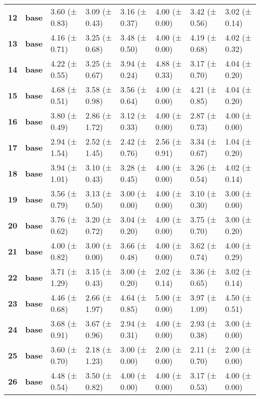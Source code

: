 \begin{longtable}{llllllll}
\cline{1-8}
\textbf{12} & \textbf{base} & 3.60 (± 0.83) & 3.09 (± 0.43) & 3.16 (± 0.37) & 4.00 (± 0.00) & 3.42 (± 0.56) & 3.02 (± 0.14) \\
\cline{1-8}
\textbf{13} & \textbf{base} & 4.16 (± 0.71) & 3.25 (± 0.68) & 3.48 (± 0.50) & 4.00 (± 0.00) & 4.19 (± 0.68) & 4.02 (± 0.32) \\
\cline{1-8}
\textbf{14} & \textbf{base} & 4.22 (± 0.55) & 3.25 (± 0.67) & 3.94 (± 0.24) & 4.88 (± 0.33) & 3.17 (± 0.70) & 4.04 (± 0.20) \\
\cline{1-8}
\textbf{15} & \textbf{base} & 4.68 (± 0.51) & 3.58 (± 0.98) & 3.56 (± 0.64) & 4.00 (± 0.00) & 4.21 (± 0.85) & 4.04 (± 0.20) \\
\cline{1-8}
\textbf{16} & \textbf{base} & 3.80 (± 0.49) & 2.86 (± 1.72) & 3.12 (± 0.33) & 4.00 (± 0.00) & 2.87 (± 0.73) & 4.00 (± 0.00) \\
\cline{1-8}
\textbf{17} & \textbf{base} & 2.94 (± 1.54) & 2.52 (± 1.45) & 2.42 (± 0.76) & 2.56 (± 0.91) & 3.34 (± 0.67) & 1.04 (± 0.20) \\
\cline{1-8}
\textbf{18} & \textbf{base} & 3.94 (± 1.01) & 3.10 (± 0.43) & 3.28 (± 0.45) & 4.00 (± 0.00) & 3.26 (± 0.54) & 4.02 (± 0.14) \\
\cline{1-8}
\textbf{19} & \textbf{base} & 3.56 (± 0.79) & 3.13 (± 0.50) & 3.00 (± 0.00) & 4.00 (± 0.00) & 3.10 (± 0.30) & 3.00 (± 0.00) \\
\cline{1-8}
\textbf{20} & \textbf{base} & 3.76 (± 0.62) & 3.20 (± 0.72) & 3.04 (± 0.20) & 4.00 (± 0.00) & 3.75 (± 0.70) & 3.00 (± 0.20) \\
\cline{1-8}
\textbf{21} & \textbf{base} & 4.00 (± 0.82) & 3.00 (± 0.00) & 3.66 (± 0.48) & 4.00 (± 0.00) & 3.62 (± 0.74) & 4.00 (± 0.29) \\
\cline{1-8}
\textbf{22} & \textbf{base} & 3.71 (± 1.29) & 3.15 (± 0.43) & 3.00 (± 0.20) & 2.02 (± 0.14) & 3.36 (± 0.65) & 3.02 (± 0.14) \\
\cline{1-8}
\textbf{23} & \textbf{base} & 4.46 (± 0.68) & 2.66 (± 1.97) & 4.64 (± 0.85) & 5.00 (± 0.00) & 3.97 (± 1.09) & 4.50 (± 0.51) \\
\cline{1-8}
\textbf{24} & \textbf{base} & 3.68 (± 0.91) & 3.67 (± 0.96) & 2.94 (± 0.31) & 4.00 (± 0.00) & 2.93 (± 0.38) & 3.00 (± 0.00) \\
\cline{1-8}
\textbf{25} & \textbf{base} & 3.60 (± 0.70) & 2.18 (± 1.23) & 3.00 (± 0.00) & 2.00 (± 0.00) & 2.11 (± 0.70) & 2.00 (± 0.00) \\
\cline{1-8}
\textbf{26} & \textbf{base} & 4.48 (± 0.54) & 3.50 (± 0.82) & 4.00 (± 0.00) & 4.00 (± 0.00) & 3.17 (± 0.53) & 4.00 (± 0.00) \\

\end{longtable}
